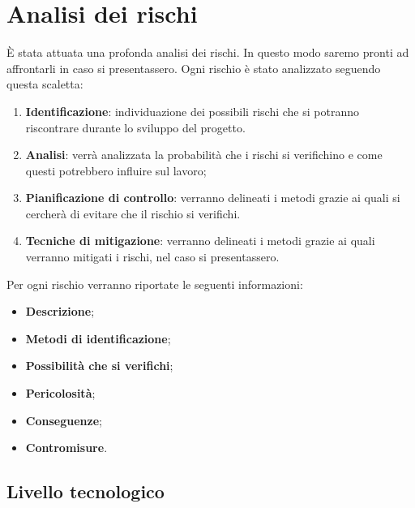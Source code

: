 \section{Analisi dei rischi} 
	È stata attuata una profonda analisi dei rischi. In questo modo saremo pronti ad affrontarli in caso si presentassero.
	Ogni rischio è stato analizzato seguendo questa scaletta:
	\begin{enumerate}
		\item \textbf{Identificazione}: individuazione dei possibili rischi che si potranno riscontrare durante lo sviluppo del progetto.
		\item \textbf{Analisi}: verrà analizzata la probabilità che i rischi si verifichino e come questi potrebbero influire sul lavoro;
		\item \textbf{Pianificazione di controllo}: verranno delineati i metodi grazie ai quali si cercherà di evitare che il rischio si verifichi.
		\item \textbf{Tecniche di mitigazione}: verranno delineati i metodi grazie ai quali verranno mitigati i rischi, nel caso si presentassero.
	\end{enumerate}
	Per ogni rischio verranno riportate le seguenti informazioni:
	\begin{itemize}
		\item \textbf{Descrizione};
		\item \textbf{Metodi di identificazione};
		\item \textbf{Possibilità che si verifichi};
		\item \textbf{Pericolosità};
		\item \textbf{Conseguenze};
		\item \textbf{Contromisure}.
	\end{itemize}
	
	\subsection{Livello tecnologico}
